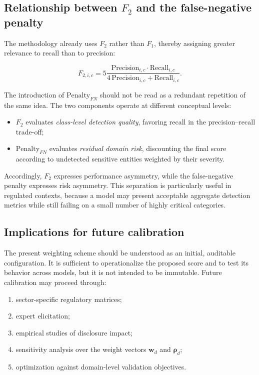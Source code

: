 \documentclass[11pt,a4paper]{article}
\begin{document}
\subsection{Relationship between \(F_2\) and the false-negative penalty}

The methodology already uses \(F_2\) rather than \(F_1\), thereby assigning greater relevance to recall than to precision:

\begin{equation}
    F_{2,i,c}=
    5
    \frac{
    \mathrm{Precision}_{i,c}\cdot\mathrm{Recall}_{i,c}
    }{
    4\,\mathrm{Precision}_{i,c}+\mathrm{Recall}_{i,c}
    }.
\end{equation}

The introduction of \(\mathrm{Penalty}_{FN}\) should not be read as a redundant repetition of the same idea. The two components operate at different conceptual levels:

\begin{itemize}
    \item \(F_2\) evaluates \textit{class-level detection quality}, favoring recall in the precision--recall trade-off;
    \item \(\mathrm{Penalty}_{FN}\) evaluates \textit{residual domain risk}, discounting the final score according to undetected sensitive entities weighted by their severity.
\end{itemize}

Accordingly, \(F_2\) expresses performance asymmetry, while the false-negative penalty expresses risk asymmetry. This separation is particularly useful in regulated contexts, because a model may present acceptable aggregate detection metrics while still failing on a small number of highly critical categories.

\subsection{Implications for future calibration}

The present weighting scheme should be understood as an initial, auditable configuration. It is sufficient to operationalize the proposed score and to test its behavior across models, but it is not intended to be immutable. Future calibration may proceed through:

\begin{enumerate}
    \item sector-specific regulatory matrices;
    \item expert elicitation;
    \item empirical studies of disclosure impact;
    \item sensitivity analysis over the weight vectors \(\mathbf{w}_d\) and \(\boldsymbol{\rho}_d\);
    \item optimization against domain-level validation objectives.
\end{enumerate}
\end{document}
